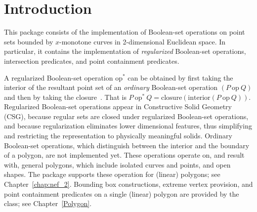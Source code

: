 \newcommand{\reals}{{\rm I\!\hspace{-0.025em} R}}
\newcommand{\calC}{{\cal C}}
\newcommand{\calA}{{\cal A}}
\newcommand{\eps}{{\varepsilon}}
\newcommand{\dcel}{{\sc Dcel}}
\newcommand{\naive}{na\"{\i}ve}
\newcommand{\kdtree}{{\sc Kd}-tree}

\section{Introduction}
\label{bobs_sec:intro}
%
This package consists of the implementation of Boolean-set operations
on point sets bounded by $x$-monotone curves in 2-dimensional
Euclidean space. In particular, it contains the implementation of
{\em regularized} Boolean-set operations, intersection predicates, and
point containment predicates.

A regularized Boolean-set operation $\mbox{op}^*$ can be obtained by
first taking the interior of the resultant point set of an {\em ordinary}
Boolean-set operation $(P\ \mbox{op}\ Q)$ and then by taking the
closure~\cite{h-sm-04}. That is
$P\ \mbox{op}^*\ Q = \mbox{closure}(\mbox{interior} (P\ \mbox{op}\ Q))$.
Regularized Boolean-set operations appear in Constructive Solid
Geometry (CSG), because regular sets are closed under regularized
Boolean-set operations, and because regularization eliminates lower
dimensional features, thus simplifying and restricting the
representation to physically meaningful solids.
Ordinary Boolean-set operations, which distinguish between the
interior and the boundary of a polygon, are not implemented yet. These
operations operate on, and result with, general polygons, which
include isolated curves and points, and open shapes. The 
package supports these operation for (linear) polygons; see
Chapter~\ref{chap:nef_2}. Bounding box constructions, extreme vertex
provision, and point containment predicates on a single (linear)
polygon are provided by the  class; see
Chapter~\ref{Polygon}.

